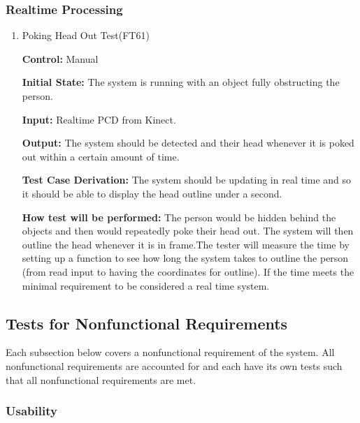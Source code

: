 \documentclass[12pt, titlepage]{article}
\begin{document}
\subsubsection{Realtime Processing}

\begin{enumerate}

\item{Poking Head Out Test(FT61)\label{FT61}\\}

\textbf{Control:} Manual

\textbf{Initial State:} The system is running with an object fully obstructing the person.

\textbf{Input:} Realtime PCD from Kinect.

\textbf{Output:} The system should be detected and their head whenever it is poked out within a certain amount of time.

\textbf{Test Case Derivation:} The system should be updating in real time and so it should be able to display the head outline under a second.

\textbf{How test will be performed:} The person would be hidden behind the objects and then would repeatedly poke their head out. The system will then outline the head whenever it is in frame.The tester will measure the time by setting up a function to see how long the system takes to outline the person (from read input to having the coordinates for outline). If the time meets the minimal requirement to be considered a real time system.

\end{enumerate}


\subsection{Tests for Nonfunctional Requirements}

Each subsection below covers a nonfunctional requirement of the system. All nonfunctional requirements are accounted for and each have its own tests such that all nonfunctional requirements are met.

\subsubsection{Usability}
\end{document}
